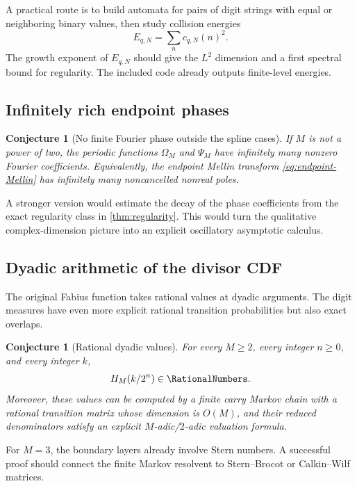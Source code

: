 \documentclass[11pt,oneside]{article}
\newtheorem{conjecture}[theorem]{Conjecture}
\theoremstyle{definition}
\theoremstyle{remark}
\begin{document}
A practical route is to build automata for pairs of digit strings with equal or neighboring
binary values, then study collision energies
\[
 E_{q,N}=\sum_n c_{q,N}(n)^2.
\]
The growth exponent of $E_{q,N}$ should give the $L^2$ dimension and a first spectral
bound for regularity.  The included code already outputs finite-level energies.

\subsection{Infinitely rich endpoint phases}

\begin{conjecture}[No finite Fourier phase outside the spline cases]
\label{conj:phase-modes}
If $M$ is not a power of two, the periodic functions $\Omega_M$ and $\Psi_M$ have
infinitely many nonzero Fourier coefficients.  Equivalently, the endpoint Mellin transform
\eqref{eq:endpoint-Mellin} has infinitely many noncancelled nonreal poles.
\end{conjecture}

A stronger version would estimate the decay of the phase coefficients from the exact
regularity class in \cref{thm:regularity}.  This would turn the qualitative complex-dimension
picture into an explicit oscillatory asymptotic calculus.

\subsection{Dyadic arithmetic of the divisor CDF}

The original Fabius function takes rational values at dyadic arguments.  The digit measures
have even more explicit rational transition probabilities but also exact overlaps.

\begin{conjecture}[Rational dyadic values]
\label{conj:dyadic-rationality}
For every $M\ge2$, every integer $n\ge0$, and every integer $k$,
\begin{equation}
 H_M(k/2^n)\in\RationalNumbers.
 \label{eq:dyadic-H-conj}
\end{equation}
Moreover, these values can be computed by a finite carry Markov chain with a rational
transition matrix whose dimension is $O(M)$, and their reduced denominators satisfy an
explicit $M$-adic/$2$-adic valuation formula.
\end{conjecture}

For $M=3$, the boundary layers already involve Stern numbers.  A successful proof should
connect the finite Markov resolvent to Stern--Brocot or Calkin--Wilf matrices.
\end{document}
